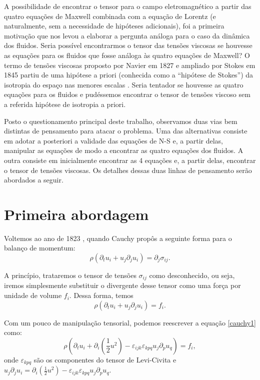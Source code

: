 A possibilidade de encontrar o tensor para o campo eletromagnético a partir das quatro equações de Maxwell combinada com a equação de Lorentz (e naturalmente, sem a necessidade de hipóteses adicionais), foi a primeira motivação que nos levou a elaborar a pergunta análoga para o caso da dinâmica dos fluidos. Seria possível encontrarmos o tensor das tensões viscosas se houvesse as equações para os fluidos que fosse análoga às quatro equações de Maxwell? O termo de tensões viscosas proposto por Navier em 1827 \cite{naiver1827lois} e ampliado por Stokes em 1845 \cite{stokes2007theories} partiu de uma hipótese a priori (conhecida como a “hipótese de Stokes”) da isotropia do espaço nas menores escalas \cite{batchelor2000introduction}\cite{panton2013incompressible}. Seria tentador se houvesse as quatro equações para os fluidos e pudéssemos encontrar o tensor de tensões viscoso sem a referida hipótese de isotropia a priori.

Posto o questionamento principal deste trabalho, observamos duas vias bem distintas de pensamento para atacar o problema. Uma das alternativas consiste em adotar a posteriori a validade das equações de N-S e, a partir delas, manipular as equações de modo a encontrar as quatro equações dos fluidos.  A outra consiste em inicialmente encontrar as 4 equações e, a partir delas, encontrar o tensor de tensões viscosas. Os detalhes dessas duas linhas de pensamento serão abordados a seguir.

\section{Primeira abordagem}

Voltemos ao ano de 1823 \cite{truesdell1953notes}, quando Cauchy propôs a seguinte forma para o balanço de momentum:
\begin{equation}\label{cauchy}
\rho(\partial_{t} u_{i}+ u_{j}\partial_{j} u_{i})= \partial_{j}\sigma_{ij}.
\end{equation}

A princípio, trataremos o tensor de tensões $\sigma_{ij}$ como desconhecido, ou seja, iremos simplesmente substituir o divergente desse tensor como uma força por unidade de volume $f_{i}$. Dessa forma, temos
\begin{equation}\label{cauchy1}
\rho(\partial_{t} u_{i}+ u_{j}\partial_{j} u_{i})=f_i.
\end{equation}

Com um pouco de manipulação tensorial, podemos reescrever a equação \ref{cauchy1} como:
\begin{equation}\label{cauchy2}
\rho\left(\partial_{t} u_{i}+ \partial_{i}\left(\frac{1}{2}u^2\right) - \varepsilon_{ijk}\varepsilon_{kpq}u_{j}\partial_{p}u_{q}\right)=f_i,
\end{equation}
onde $\varepsilon_{kpq}$ são os componentes do tensor de Levi-Civita e $u_{j}\partial_{j} u_{i} = \partial_{i}\left(\frac{1}{2}u^2\right) - \varepsilon_{ijk}\varepsilon_{kpq}u_{j}\partial_{p}u_{q}$.

